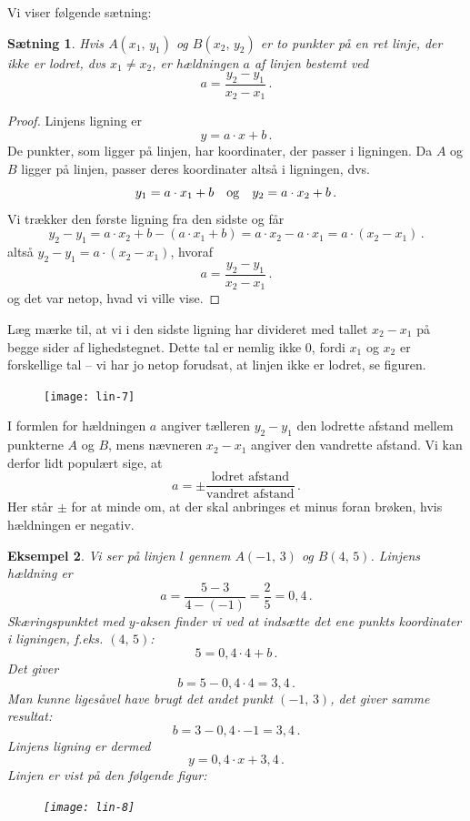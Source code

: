 \documentclass[12pt,oneside,a4paper]{article}
\newtheorem{thm}{Sætning}[section]
\newtheorem{eks}[thm]{Eksempel}
\begin{document}
Vi viser følgende sætning:
\begin{tcolorbox}
\begin{thm}
    Hvis $A(x_1,\,y_1)$ og $B(x_2,\,y_2)$ er to punkter på en ret linje, der ikke
    er lodret, dvs $x_1\neq x_2$, er hældningen $a$ af linjen bestemt ved
    \[
    a = \frac{y_2-y_1}{x_2-x_1} \,.
    \]
\end{thm}
\end{tcolorbox}

\begin{proof}
    Linjens ligning er
    \[
    y = a\cdot x + b \,.
    \]
    De punkter, som ligger på linjen, har koordinater, der passer i
    ligningen.  Da $A$ og $B$ ligger på linjen, passer deres koordinater altså
    i ligningen, dvs.
    \[
    y_1 = a\cdot x_1 + b \quad {\rm og} \quad y_2 = a\cdot x_2 + b \,.
    \]
    Vi trækker den første ligning fra den sidste og får
    \[
    y_2 - y_1 = a\cdot x_2 + b - (a\cdot x_1 + b) 
              = a\cdot x_2 - a\cdot x_1 
              = a\cdot \left(x_2-x_1\right)  \,.
    \]
    altså $y_2-y_1 = a \cdot \left(x_2-x_1\right)$, hvoraf
    \[
    a = \frac{y_2-y_1}{x_2-x_1} \,.
    \]
    og det var netop, hvad vi ville vise.
\end{proof}

Læg mærke til, at vi i den sidste ligning har divideret med tallet $x_2-x_1$ på
begge sider af lighedstegnet. Dette tal er nemlig ikke $0$, fordi $x_1$ og
$x_2$ er forskellige tal -- vi har jo netop forudsat, at linjen ikke er lodret, se
figuren.

\begin{figure}[H]
    \centering
    \texttt{[image: lin-7]}
    \caption{}
    \label{linear-2}
\end{figure}

I formlen for hældningen $a$ angiver tælleren $y_2-y_1$ den lodrette afstand
mellem punkterne $A$ og $B$, mens nævneren $x_2-x_1$ angiver den vandrette
afstand. Vi kan derfor lidt populært sige, at
\[
a = \pm \frac{\mbox{lodret afstand}}{\mbox{vandret afstand}} \,.
\]
Her står $\pm$ for at minde om, at der skal anbringes et minus foran brøken,
hvis hældningen er negativ.
\begin{tcolorbox}
\begin{eks}
    Vi ser på linjen $l$ gennem $A(-1,\,3)$ og $B(4,\,5)$.
    Linjens hældning er
    \[
    a = \frac{5-3}{4-(-1)} = \frac{2}{5} = 0,4\,.
    \]
    Skæringspunktet med $y$-aksen finder vi ved at indsætte det ene punkts
    koordinater i ligningen, f.eks. $(4,\, 5)$:
    \[
    5 = 0,4\cdot 4 + b\,.
    \]
    Det giver
    \[
    b = 5 - 0,4\cdot 4 = 3,4\,.
    \]
    Man kunne ligesåvel have brugt det andet punkt $(-1,\,3)$, det giver samme
    resultat:
    \[
        b=3 - 0,4\cdot -1 = 3,4\,.
    \]
    Linjens ligning er dermed
    \[
    y = 0,4 \cdot x + 3,4\,.
    \]
    Linjen er vist på den følgende figur:
\begin{figure}[H]
    \centering
    \texttt{[image: lin-8]}
    \caption{}
    \label{linear-3}
\end{figure}
\end{eks}
\end{tcolorbox}
\end{document}
